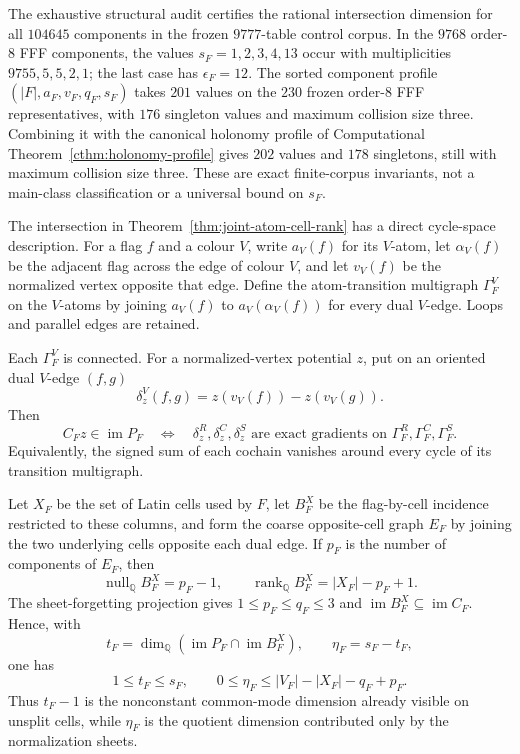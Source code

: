 The exhaustive structural audit certifies the rational intersection
dimension for all $104645$ components in the frozen $9777$-table control
corpus.  In the $9768$ order-$8$ FFF components, the values
$s_F=1,2,3,4,13$ occur with multiplicities $9755,5,5,2,1$; the last case has
$\epsilon_F=12$.  The sorted component profile
$(|F|,a_F,v_F,q_F,s_F)$ takes $201$ values on the $230$ frozen order-$8$ FFF
representatives, with $176$ singleton values and maximum collision size
three.  Combining it with the canonical holonomy profile of
Computational Theorem~\ref{cthm:holonomy-profile} gives $202$ values and
$178$ singletons, still with maximum collision size three.  These are exact
finite-corpus invariants, not a main-class classification or a universal
bound on $s_F$.

The intersection in Theorem~\ref{thm:joint-atom-cell-rank} has a direct
cycle-space description.  For a flag $f$ and a colour $V$, write $a_V(f)$
for its $V$-atom, let $\alpha_V(f)$ be the adjacent flag across the edge of
colour $V$, and let $v_V(f)$ be the normalized vertex opposite that edge.
Define the atom-transition multigraph $\Gamma_F^V$ on the $V$-atoms by
joining $a_V(f)$ to $a_V(\alpha_V(f))$ for every dual $V$-edge.  Loops and
parallel edges are retained.

\begin{theorem}
\label{thm:common-mode-gradient}
Each $\Gamma_F^V$ is connected.  For a normalized-vertex potential $z$, put
on an oriented dual $V$-edge $(f,g)$
\[
 \delta_z^V(f,g)=z(v_V(f))-z(v_V(g)).
\]
Then
\[
 C_Fz\in\operatorname{im}P_F
 \quad\Longleftrightarrow\quad
 \delta_z^R,\delta_z^C,\delta_z^S
 \text{ are exact gradients on }
 \Gamma_F^R,\Gamma_F^C,\Gamma_F^S.                 \tag{13}
\]
Equivalently, the signed sum of each cochain vanishes around every cycle of
its transition multigraph.

Let $X_F$ be the set of Latin cells used by $F$, let $B_F^X$ be the
flag-by-cell incidence restricted to these columns, and form the coarse
opposite-cell graph $E_F$ by joining the two underlying cells opposite each
dual edge.  If $p_F$ is the number of components of $E_F$, then
\[
 \operatorname{null}_{\mathbb Q}B_F^X=p_F-1,
 \qquad
 \operatorname{rank}_{\mathbb Q}B_F^X=|X_F|-p_F+1. \tag{14}
\]
The sheet-forgetting projection gives $1\leq p_F\leq q_F\leq3$ and
$\operatorname{im}B_F^X\subseteq\operatorname{im}C_F$.  Hence, with
\[
 t_F=\dim_{\mathbb Q}(\operatorname{im}P_F\cap
                       \operatorname{im}B_F^X),
 \qquad \eta_F=s_F-t_F,
\]
one has
\[
 1\leq t_F\leq s_F,
 \qquad
 0\leq\eta_F\leq |V_F|-|X_F|-q_F+p_F.             \tag{15}
\]
Thus $t_F-1$ is the nonconstant common-mode dimension already visible on
unsplit cells, while $\eta_F$ is the quotient dimension contributed only by
the normalization sheets.
\end{theorem}

